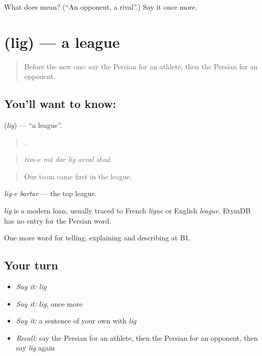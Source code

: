 \begin{tcolorbox}[breakable,colback=teal!4,colframe=teal!35!black,title={Before you move on}]
What does  mean? (\textquotedblleft{}An opponent, a rival\textquotedblright{}.) Say it once more.
\end{tcolorbox}
\section[\texorpdfstring{\fa{لیگ} (lig)}{لیگ (lig)}]{ (lig) — a league}

\label{lesson:FA-C512-lig}



\begin{quote}
Before the new one: say the Persian for an athlete, then the Persian for an opponent.
\end{quote}

\subsection*{You'll want to know: }
\textbf{} (\emph{lig}) — \textquotedblleft{}a league\textquotedblright{}.

\begin{quote}
     .
\end{quote}

\begin{quote}
\emph{tim-e mâ dar lig avval shod.}
\end{quote}

\begin{quote}
Our team came first in the league.
\end{quote}

\emph{lig-e bartar} — the top league.

\begin{cousinweb}
\emph{lig} is a modern loan, usually traced to French \emph{ligue} or English \emph{league}. EtymDB has no entry for the Persian word.
\end{cousinweb}

\begin{grammarlens}[title={What you've built}]
One more word for telling, explaining and describing at B1.
\end{grammarlens}

\subsection*{Your turn}
\begin{itemize}
\raggedright
  \item \emph{Say it:} \emph{lig}
  \item \emph{Say it:} \emph{lig}, once more
  \item \emph{Say it:} a sentence of your own with \emph{lig}
  \item \emph{Recall:} say the Persian for an athlete, then the Persian for an opponent, then say \emph{lig} again
\end{itemize}

